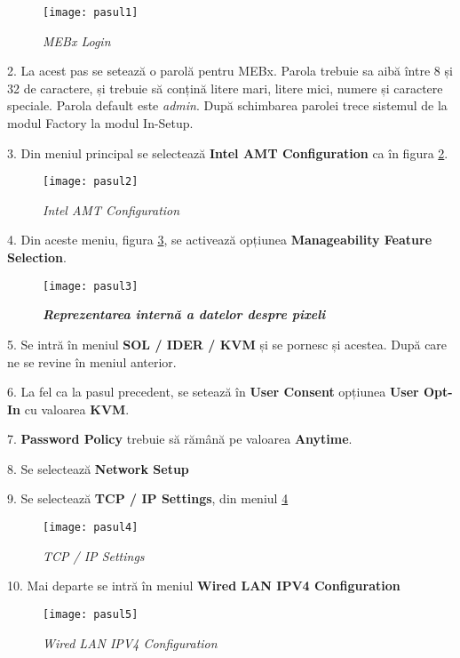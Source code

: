\begin{figure}
    \centering
    \texttt{[image: pasul1]}
    \caption{\textit{MEBx Login}}
    \label{pas1}
\end{figure}

2. La acest pas se setează o parolă pentru MEBx. Parola trebuie sa aibă între 8 și 32 de caractere, și trebuie să conțină litere mari, litere mici, numere și caractere speciale. Parola default este \textit{admin}. După schimbarea parolei trece sistemul de la modul Factory la modul In-Setup.

3. Din meniul principal se selectează \textbf{Intel AMT Configuration} ca în figura \ref{pas2}.

\begin{figure}
    \centering
    \texttt{[image: pasul2]}
    \caption{\textit{Intel AMT Configuration}}
    \label{pas2}
\end{figure}

4. Din aceste meniu, figura \ref{pas3}, se activează opțiunea \textbf{Manageability Feature Selection}.

\begin{figure}
    \centering
    \texttt{[image: pasul3]}
    \caption{\textit{\textbf{Reprezentarea internă a datelor despre pixeli}}}
    \label{pas3}
\end{figure}

5. Se intră în meniul \textbf{SOL / IDER / KVM} și se pornesc și acestea. După care ne se revine în meniul anterior.

6. La fel ca la pasul precedent, se setează în \textbf{User Consent} opțiunea \textbf{User Opt-In} cu valoarea \textbf{KVM}.

7. \textbf{Password Policy} trebuie să rămână pe valoarea \textbf{Anytime}.

8. Se selectează \textbf{Network Setup}

9. Se selectează \textbf{TCP / IP Settings}, din meniul \ref{pas4}

\begin{figure}
    \centering
    \texttt{[image: pasul4]}
    \caption{\textit{TCP / IP Settings}}
    \label{pas4}
\end{figure}

10. Mai departe se intră în meniul \textbf{Wired LAN IPV4 Configuration}

\begin{figure}
    \centering
    \texttt{[image: pasul5]}
    \caption{\textit{Wired LAN IPV4 Configuration}}
    \label{pas5}
\end{figure}

